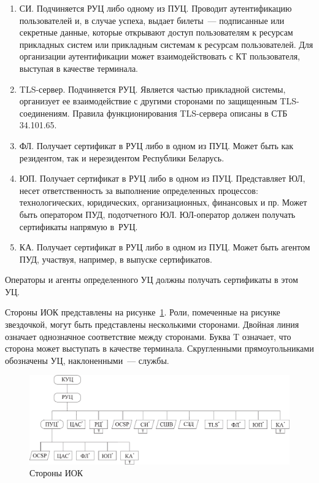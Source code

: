 \begin{enumerate}
\item
СИ. Подчиняется РУЦ либо одному из ПУЦ.
Проводит аутентификацию пользователей и, в случае успеха, выдает билеты~---
подписанные или секретные данные, которые открывают доступ пользователям к 
ресурсам прикладных систем или прикладным системам к ресурсам пользователей.
Для организации аутентификации может взаимодействовать с КТ пользователя,
выступая в качестве терминала.

\item
TLS-сервер. Подчиняется РУЦ.
Является частью прикладной системы, организует ее взаимодействие 
с другими сторонами по защищенным TLS-соединениям. 
Правила функционирования TLS-сервера описаны в СТБ 34.101.65.

\item
ФЛ. Получает сертификат в РУЦ либо в одном из ПУЦ.
Может быть как резидентом, так и нерезидентом Республики Беларусь.

\item
ЮП. Получает сертификат в РУЦ либо в одном из ПУЦ.
%
Представляет ЮЛ, несет ответственность за выполнение определенных 
процессов: технологических, юридических, организационных, финансовых и пр.
%
Может быть оператором ПУД, подотчетного ЮЛ.
ЮЛ-оператор должен получать сертификаты напрямую в~РУЦ.

\item
КА. Получает сертификат в РУЦ либо в одном из ПУЦ.
%
Может быть агентом ПУД, участвуя, например, в выпуске сертификатов.
\end{enumerate}


Операторы и агенты определенного УЦ должны получать сертификаты в этом УЦ.

Стороны ИОК представлены на рисунке~\ref{Fig.ENTITIES.1}.
Роли, помеченные на рисунке звездочкой, могут быть представлены 
несколькими сторонами. Двойная линия означает однозначное соответствие 
между сторонами. Буква T означает, что сторона может выступать в качестве 
терминала. Скругленными прямоугольниками обозначены УЦ, наклоненными~--- службы.

\begin{figure}[hbt]
\begin{center}
\includegraphics[width=16cm]{../figs/entities}
\end{center}
\caption{Стороны ИОК}
\label{Fig.ENTITIES.1}
\end{figure}

